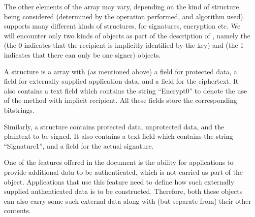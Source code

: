{The other elements of the \mCbor{} array may vary, depending on the kind of \mCose{} structure being considered (determined by the operation performed, and algorithm used). \mCose{} supports many different kinds of structures, for signatures, encryption etc. We will encounter only two kinds of \mCose{} objects as part of the description of \mEdhoc, namely the \mCoseEncrypt{} (the 0 indicates that the recipient is implicitly identified by the key) and \mCoseSign{} (the 1 indicates that there can only be one signer) objects.

A \mCoseEncrypt{} structure is a \mCbor{} array with (as mentioned above) a field for protected data, a field for externally supplied application data, and a field for the ciphertext. It also contains a text field which contains the string ``Encrypt0'' to denote the use of the method with implicit recipient. All these fields store the corresponding bitstrings.

Similarly, a \mCoseSign{} structure contains protected data, unprotected data, and the plaintext to be signed. It also contains a text field which contains the string ``Signature1'', and a field for the actual signature.

One of the features offered in the \mCose{} document is the ability for applications to provide additional data to be authenticated, which is not carried as part of the \mCose{} object. Applications that use this feature need to define how such externally supplied authenticated data is to be constructed. Therefore, both these objects can also carry some such external data along with (but separate from) their other contents.


}
